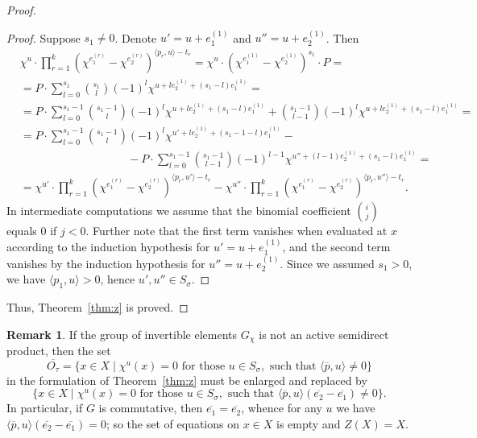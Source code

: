 \documentclass[a4paper, 11pt]{amsart}
\theoremstyle{plain}
\theoremstyle{remark}
\theoremstyle{definition}
\newtheorem{remark}[theorem]{Remark}
\newcommand{\ol}[1]{\overline{#1}}
\begin{document}
\begin{proof}
\begin{proof}
Suppose $s_1 \neq 0$. Denote $u' = u + e_1^{(1)}$ and $u'' = u + e_2^{(1)}$. Then
\begin{align*} 
	&\chi^u \cdot \prod\limits_{r = 1}^{k}\left( \chi^{e_1^{(r)}} - \chi^{e_2^{(r)}}\right)^{\langle p_r , u\rangle - t_r}  \!\!= 
	\chi^u \cdot \left( \chi^{e_1^{(1)}} \!\!- \chi^{e_2^{(1)}}\right)^{s_1} \!\!\cdot P = \\
	&= P \cdot \sum\limits_{l = 0}^{s_1} {s_1 \choose l} (-1)^l \chi^{u+ le_2^{(1)} + (s_1 - l)e_1^{(1)}}=\\
	&= P \cdot \sum\limits_{l = 0}^{s_1-1} {s_1-1 \choose l} (-1)^l \chi^{u+ le_2^{(1)} + (s_1 - l)e_1^{(1)}} + {s_1-1 \choose l-1} (-1)^l \chi^{u+ le_2^{(1)} + (s_1 - l)e_1^{(1)}}=\\
	&= P \cdot \sum\limits_{l = 0}^{s_1-1} {s_1-1 \choose l} (-1)^l \chi^{u' + le_2^{(1)} + (s_1 -1 - l)e_1^{(1)}} - \\
	&\hspace{4cm}- P \cdot \sum\limits_{l = 0}^{s_1-1} {s_1-1 \choose l-1} (-1)^{l-1} \chi^{u''+  (l - 1)e_2^{(1)} + (s_1 - l)e_1^{(1)}}=\\
	&= \chi^{u'} \cdot \prod\limits_{r = 1}^{k}\left(\chi^{e_1^{(r)}} - \chi^{e_2^{(r)}}\right)^{\langle p_r , u'\rangle - t_r}
	- \chi^{u''} \cdot \prod\limits_{r = 1}^{k}\left( \chi^{e_1^{(r)}} - \chi^{e_2^{(r)}}\right)^{\langle p_r , u''\rangle - t_r}.
\end{align*}
In intermediate computations we assume that the binomial coefficient ${i \choose j}$ equals $0$ if $j < 0$. Further note that the first term vanishes when evaluated at $x$ according to the induction hypothesis for $u' = u + e_1^{(1)}$, and the second term vanishes by the induction hypothesis for $u'' = u + e_2^{(1)}$. Since we assumed $s_1 > 0$, we have $\langle p_1, u \rangle > 0$, hence $u', u'' \in S_\sigma$.
\end{proof}
Thus, Theorem~\ref{thm:z} is proved.
\end{proof}

\begin{remark}
If the group of invertible elements $G_\chi$ is not an active semidirect product, then the set
\[\ol{O_\tau} = \{x \in X \mid \chi^u(x) = 0 \text{ for those } u \in S_\sigma, \text{ such that } \langle \ol{p}, u \rangle \ne 0\}\] 
in the formulation of Theorem~\ref{thm:z} must be enlarged and replaced by
\[\{x \in X \mid \chi^u(x) = 0 \text{ for those } u \in S_\sigma, \text{ such that } \langle \ol{p}, u \rangle (\ol{e_2} - \ol{e_1}) \ne 0\}.\]
In particular, if $G$ is commutative, then $\ol{e_1} = \ol{e_2}$, whence for any $u$ we have $\langle\ol{p}, u \rangle (\ol{e_2} - \ol{e_1}) = 0$; so the set of equations on $x \in X$ is empty and $Z(X) = X$.
\end{remark}
\end{document}
